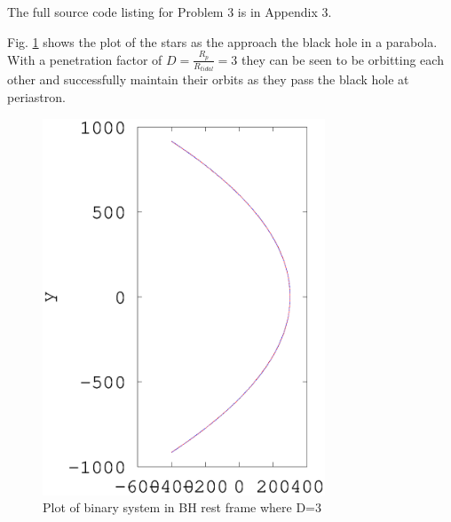 \documentclass[a4paper,12pt]{article}
\begin{document}
The full source code listing for Problem 3 is in Appendix 3.

Fig. \ref{fig:problem3_1} shows the plot of the stars as the approach the black hole in a parabola. With a penetration factor of $D=\frac{R_p}{R_{tidal}}=3$ they can be seen to be orbitting each other and successfully maintain their orbits as they pass the black hole at periastron.
\begin{figure}[H]
\centering
\includegraphics[width=0.75\textwidth]{./problem3/problem3_1}
\caption{Plot of binary system in BH rest frame where D=3}
\label{fig:problem3_1}
\end{figure}
\end{document}
